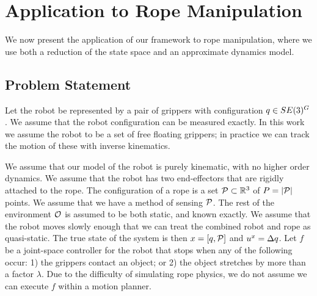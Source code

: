 



\section{Application to Rope Manipulation}


We now present the application of our framework to rope manipulation, where we use both a reduction of the state space and an approximate dynamics model.


\subsection{Problem Statement}
Let the robot be represented by a pair of grippers with configuration $q \in SE(3)^G$. We assume that the robot configuration can be measured exactly. In this work we assume the robot to be a set of free floating grippers; in practice we can track the motion of these with inverse kinematics.

We assume that our model of the robot is purely kinematic, with no higher order dynamics. We assume that the robot has two end-effectors that are rigidly attached to the rope. The configuration of a rope is a set $\mathcal{P} \subset \mathbb{R}^3$ of $P = | \mathcal{P} |$ points. We assume that we have a method of sensing $\mathcal{P}$. The rest of the environment $\mathcal{O}$ is assumed to be both static, and known exactly. We assume that the robot moves slowly enough that we can treat the combined robot and rope as quasi-static. The true state of the system is then $x = [q,\mathcal{P}]$ and $u^x = \Delta q$. Let $f$ be a joint-space controller for the robot that stops when any of the following occur: 1) the grippers contact an object; or 2) the object stretches by more than a factor $\lambda$. Due to the difficulty of simulating rope physics, we do not assume we can execute $f$ within a motion planner.

